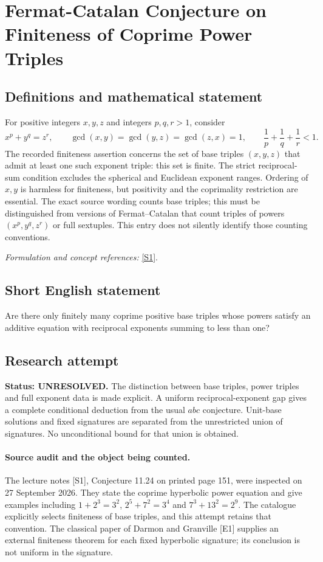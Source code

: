 \documentclass[11pt]{article}
\begin{document}
\section*{\texorpdfstring{Fermat-Catalan Conjecture on Finiteness of Coprime Power Triples}{Fermat-Catalan Conjecture on Finiteness of Coprime Power Triples}}\label{315}
\subsection{Definitions and mathematical statement}
For positive integers $x,y,z$ and integers $p,q,r>1$, consider
\[
 x^p+y^q=z^r,\qquad
 \gcd(x,y)=\gcd(y,z)=\gcd(z,x)=1,
 \qquad\frac1p+\frac1q+\frac1r<1.
\]
The recorded finiteness assertion concerns the set of base triples $(x,y,z)$ that admit at least one such exponent triple: this set is finite. The strict reciprocal-sum condition excludes the spherical and Euclidean exponent ranges. Ordering of $x,y$ is harmless for finiteness, but positivity and the coprimality restriction are essential. The exact source wording counts base triples; this must be distinguished from versions of Fermat--Catalan that count triples of powers $(x^p,y^q,z^r)$ or full sextuples. This entry does not silently identify those counting conventions.
\par\smallskip\textit{Formulation and concept references:} \href{https://home.cit.tum.de/~wvi/NT.pdf}{[S1]}.

\subsection{Short English statement}
Are there only finitely many coprime positive base triples whose powers satisfy an additive equation with reciprocal exponents summing to less than one?
\subsection{Research attempt}
\textbf{Status: UNRESOLVED.} The distinction between base triples, power triples and full exponent data is made explicit. A uniform reciprocal-exponent gap gives a complete conditional deduction from the usual $abc$ conjecture. Unit-base solutions and fixed signatures are separated from the unrestricted union of signatures. No unconditional bound for that union is obtained.

\paragraph{Source audit and the object being counted.}
The lecture notes [S1], Conjecture 11.24 on printed page 151, were inspected on 27 September 2026. They state the coprime hyperbolic power equation and give examples including $1+2^3=3^2$, $2^5+7^2=3^4$ and $7^3+13^2=2^9$. The catalogue explicitly selects finiteness of base triples, and this attempt retains that convention. The classical paper of Darmon and Granville [E1] supplies an external finiteness theorem for each fixed hyperbolic signature; its conclusion is not uniform in the signature.
\end{document}
